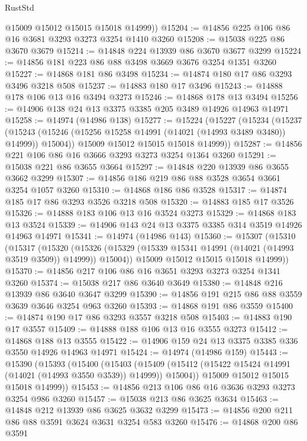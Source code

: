 \begin{lexlean}{RustStd}
\begin{coremodule}
{\begin{coremodule}
{{{{{{{{{{{{{{{{{{{{{{{{{{{{{{{{{{{{{{{        @15009
        @15012
        @15015
        @15018
        @14999))
@15204 := @14856 @225 @106 @86 @16 @3681 @3293 @3273 @3254 @1410 @3260
@15208 := @15038 @225 @86 @3670 @3679
@15214 := @14848 @224 @13939 @86 @3670 @3677 @3299
@15224 := @14856 @181 @223 @86 @88 @3498 @3669 @3676 @3254 @1351 @3260
@15227 := @14868 @181 @86 @3498
@15234 := @14874 @180 @17 @86 @3293 @3496 @3218 @508
@15237 := @14883 @180 @17 @3496
@15243 := @14888 @178 @106 @13 @16 @3494 @3273
@15246 := @14868 @178 @13 @3494
@15256 := @14906 @138 @24 @13 @3375 @3385 @205 @3489 @14926 @14963 @14971
@15258 := @14974 (@14986 @138)
@15277 := @15224
    (@15227
      (@15234
        (@15237
          (@15243 (@15246 (@15256 @15258 @14991 (@14021 (@14993 @3489 @3480)) @14999)) @15004))
        @15009
        @15012
        @15015
        @15018
        @14999))
@15287 := @14856 @221 @106 @86 @16 @3666 @3293 @3273 @3254 @1364 @3260
@15291 := @15038 @221 @86 @3655 @3664
@15297 := @14848 @220 @13939 @86 @3655 @3662 @3299
@15307 := @14856 @186 @219 @86 @88 @3528 @3654 @3661 @3254 @1057 @3260
@15310 := @14868 @186 @86 @3528
@15317 := @14874 @185 @17 @86 @3293 @3526 @3218 @508
@15320 := @14883 @185 @17 @3526
@15326 := @14888 @183 @106 @13 @16 @3524 @3273
@15329 := @14868 @183 @13 @3524
@15339 := @14906 @143 @24 @13 @3375 @3385 @314 @3519 @14926 @14963 @14971
@15341 := @14974 (@14986 @143)
@15360 := @15307
    (@15310
      (@15317
        (@15320
          (@15326 (@15329 (@15339 @15341 @14991 (@14021 (@14993 @3519 @3509)) @14999)) @15004))
        @15009
        @15012
        @15015
        @15018
        @14999))
@15370 := @14856 @217 @106 @86 @16 @3651 @3293 @3273 @3254 @1341 @3260
@15374 := @15038 @217 @86 @3640 @3649
@15380 := @14848 @216 @13939 @86 @3640 @3647 @3299
@15390 := @14856 @191 @215 @86 @88 @3559 @3639 @3646 @3254 @963 @3260
@15393 := @14868 @191 @86 @3559
@15400 := @14874 @190 @17 @86 @3293 @3557 @3218 @508
@15403 := @14883 @190 @17 @3557
@15409 := @14888 @188 @106 @13 @16 @3555 @3273
@15412 := @14868 @188 @13 @3555
@15422 := @14906 @159 @24 @13 @3375 @3385 @336 @3550 @14926 @14963 @14971
@15424 := @14974 (@14986 @159)
@15443 := @15390
    (@15393
      (@15400
        (@15403
          (@15409 (@15412 (@15422 @15424 @14991 (@14021 (@14993 @3550 @3539)) @14999)) @15004))
        @15009
        @15012
        @15015
        @15018
        @14999))
@15453 := @14856 @213 @106 @86 @16 @3636 @3293 @3273 @3254 @986 @3260
@15457 := @15038 @213 @86 @3625 @3634
@15463 := @14848 @212 @13939 @86 @3625 @3632 @3299
@15473 := @14856 @200 @211 @86 @88 @3591 @3624 @3631 @3254 @583 @3260
@15476 := @14868 @200 @86 @3591
}}}}}}}}}}}}}}}}}}}}}}}}}}}}}}}}}}}}}}}
\end{coremodule}}
\end{coremodule}
\end{lexlean}
